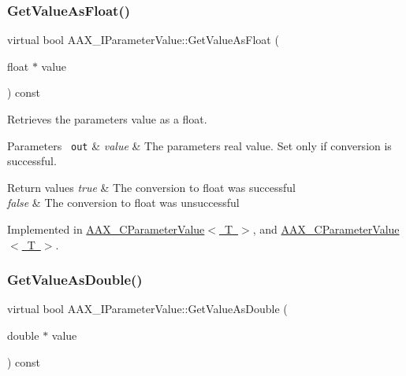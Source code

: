 \mbox{\label{a01853_a4dc47beae09bee0025374e32ccae17fb}} 
\subsubsection{\texorpdfstring{GetValueAsFloat()}{GetValueAsFloat()}}
{\footnotesize\ttfamily virtual bool A\+A\+X\+\_\+\+I\+Parameter\+Value\+::\+Get\+Value\+As\+Float (\begin{DoxyParamCaption}\item[{float $\ast$}]{value }\end{DoxyParamCaption}) const\hspace{0.3cm}{\ttfamily [pure virtual]}}



Retrieves the parameter\textquotesingle{}s value as a float. 


\begin{DoxyParams}[1]{Parameters}
\mbox{\texttt{ out}}  & {\em value} & The parameter\textquotesingle{}s real value. Set only if conversion is successful.\\
\hline
\end{DoxyParams}

\begin{DoxyRetVals}{Return values}
{\em true} & The conversion to float was successful \\
\hline
{\em false} & The conversion to float was unsuccessful \\
\hline
\end{DoxyRetVals}


Implemented in \mbox{\hyperlink{a01533_a8484adc259a40c25ac8414eac475eea3}{A\+A\+X\+\_\+\+C\+Parameter\+Value$<$ T $>$}}, and \mbox{\hyperlink{a01533_ac3301a3dc20e65906caa5610897a2a1a}{A\+A\+X\+\_\+\+C\+Parameter\+Value$<$ T $>$}}.

\mbox{\label{a01853_acb2b95aa6a7f95344b320f71ceb84a9d}} 
\subsubsection{\texorpdfstring{GetValueAsDouble()}{GetValueAsDouble()}}
{\footnotesize\ttfamily virtual bool A\+A\+X\+\_\+\+I\+Parameter\+Value\+::\+Get\+Value\+As\+Double (\begin{DoxyParamCaption}\item[{double $\ast$}]{value }\end{DoxyParamCaption}) const\hspace{0.3cm}{\ttfamily [pure virtual]}}



